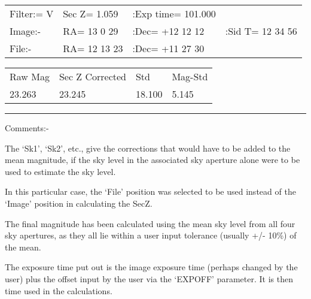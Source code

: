 \begin{small}
{{{\hspace{3ex}\begin{tabular}{llll}
  Filter:= V &Sec Z= 1.059  &:Exp time= 101.000 & \\
  Image:-    &RA= 13  0 29  & :Dec= +12 12 12   &:Sid T= 12 34 56 \\
   File:-    &RA= 12 13 23  & :Dec= +11 27 30   & \\
\end{tabular}

\hspace{3ex}\begin{tabular}{llll}
  Raw Mag    & Sec Z Corrected    & Std    & Mag-Std \\
      23.263 &   23.245         & 18.100   & 5.145 \\
\end{tabular}

\rule{5in}{0.2mm}

  Comments:-

\begin{list}{{-}}{}
    \item The `Sk1', `Sk2', etc., give the corrections that would have to be
      added to the mean magnitude, if the sky level in the associated
      sky aperture alone were to be used to estimate the sky level.
    \item  In this particular case, the `File' position was selected to be
      used instead of the `Image' position in calculating the SecZ.
    \item  The final magnitude has been calculated using the mean sky
      level from all four sky apertures, as they all lie within a user
      input tolerance (usually +/- 10\%) of the mean.
    \item  The exposure time put out is the image exposure time (perhaps
      changed by the user) plus the offset input by the user via the
      `EXPOFF' parameter. It is then time used in the calculations.
\end{list}

}}}
\end{small}
